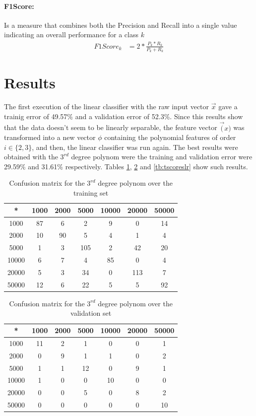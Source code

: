 \documentclass{IEEEtran}
\begin{document}
\paragraph{F1Score:} 
Is a measure that combines both the Precision and Recall into a single value indicating an overall performance for a class $k$ 
\begin{align}
F1Score_k &= 2 * \frac{P_k*R_k}{P_k+R_k} \label{eq:f1score}
\end{align}


\section{Results}
The first execution of the linear classifier with the raw input vector $\vec{x}$ gave a trainig error of 49.57\%
and a validation error of 52.3\%. Since this results show that the data doesn't seem to be linearly separable, 
the feature vector $\vec(x)$ was transformed into a new vector $\phi$ containing the polynomial features of 
order $i \in \{2,3\}$, and then, the linear classifier was run again. The best results were obtained with the
$3^{rd}$ degree polynom were the training and validation error were 29.59\% and 31.61\%  respectively. 
Tables \ref{tb:tconfmlr}, \ref{tb:vconfmlr} and \ref{tb:tscoreslr} show such results.

\begin{table}
\centering
\begin{tabular}{|c|c|c|c|c|c|c|}
\hline
* & 1000 & 2000 & 5000 & 10000 & 20000 & 50000 \\
\hline
1000 &  87 &   6 &   2 &   9 &   0 &  14 \\
2000 &  10 &  90 &   5 &   4 &   1 &   4 \\
5000 &   1 &   3 & 105 &   2 &  42 &  20 \\
10000 &   6 &   7 &   4 &  85 &   0 &   4 \\
20000 &   5 &   3 &  34 &   0 & 113 &   7 \\
50000 &  12 &   6 &  22 &   5 &   5 &  92 \\
\hline
\end{tabular}
\caption{Confusion matrix for the $3^{rd}$ degree polynom over the training set}
\label{tb:tconfmlr}
\end{table}

\begin{table}
\centering
\begin{tabular}{|c|c|c|c|c|c|c|}
\hline
* & 1000 & 2000 & 5000 & 10000 & 20000 & 50000 \\
\hline
1000 &  11 &  2 &  1 &  0 &  0 &  1 \\
2000 &  0 &  9 &  1 &  1 &  0 &  2 \\
5000 &  1 &  1 & 12 &  0 &  9 &  1 \\
10000 &  1 &  0 &  0 & 10 &  0 &  0 \\
20000 &  0 &  0 &  5 &  0 &  8 &  2 \\
50000 &  0 &  0 &  0 &  0 &  0 & 10 \\
\hline
\end{tabular}
\caption{Confusion matrix for the $3^{rd}$ degree polynom over the validation set}
\label{tb:vconfmlr}
\end{table}
\end{document}
